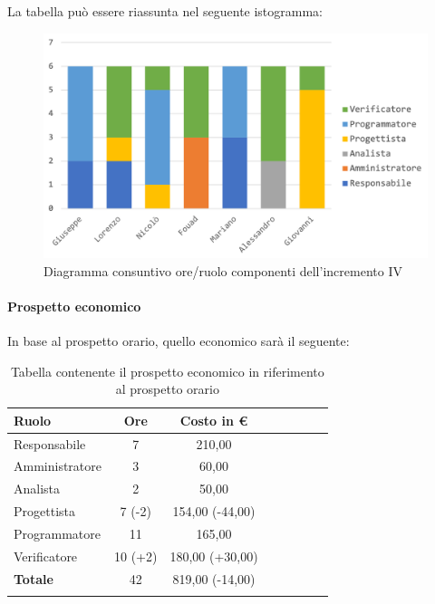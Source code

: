 			La tabella può essere riassunta nel seguente istogramma:
			
			\begin{figure}[H]
				\centering
				\includegraphics[width=0.8\linewidth]{images/consuntivo/ConsIncr4-1.png}
				\caption{Diagramma consuntivo ore/ruolo componenti dell'incremento IV}
				\label{fig:consuntivo diagramma suddivisione ruoli incremento IV}
			\end{figure}
			
		\paragraph{Prospetto economico}
			In base al prospetto orario, quello economico sarà il seguente: 
			
			\begin{longtable}{|l|c|c|c|c|c|c|c|}
				\hline
				\rowcolor{lighter-grayer}
				\textbf{Ruolo} & \textbf{Ore} & \textbf{Costo in €} \\
				\hline
				\endfirsthead
				\hline
				Responsabile 	    & 7 & 210,00\\
				\hline 
				\hline
				Amministratore	  & 3 & 60,00\\
				\hline
				\hline
				Analista 				& 2 & 50,00\\
				\hline
				\hline
				Progettista 		  & 7 (-2) & 154,00 (-44,00)\\
				\hline
				\hline
				Programmatore 	 & 11 & 165,00\\
				\hline
				\hline
				Verificatore 		  & 10 (+2) & 180,00 (+30,00) \\
				\hline
				\textbf{Totale} 	& 42 & 819,00 (-14,00)\\
				\hline
				
				\caption{Tabella contenente il prospetto economico in riferimento al prospetto orario}
			\end{longtable}
			
